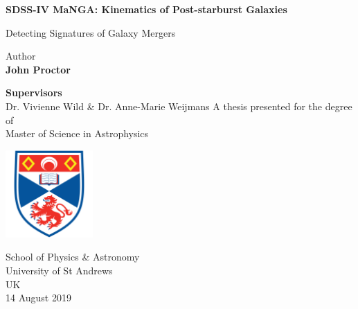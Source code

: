 
\begin{titlepage}
   \begin{center}
       \vspace*{1cm}
        
       \Huge
       \textbf{SDSS-IV MaNGA: Kinematics of Post-starburst Galaxies}
 
       \vspace{0.5cm}
       \huge
       Detecting Signatures of Galaxy Mergers 
       \vspace{1.5cm}
 
       Author\\
       \textbf{John Proctor}
       \vfill
       
       \textbf{Supervisors}\\
       Dr. Vivienne Wild \& Dr. Anne-Marie Weijmans
       \vfill
       A thesis presented for the degree of\\
       Master of Science in Astrophysics
 
       \vspace{2.5cm}
 
       \includegraphics[width=0.25\textwidth]{images/University-of-st-andrews-shield.png}
 
       \vspace{2.5cm}
       
       \Large
       School of Physics \& Astronomy\\
       University of St Andrews\\
       UK\\
       14 August 2019
   \end{center}
   
   
\end{titlepage}





